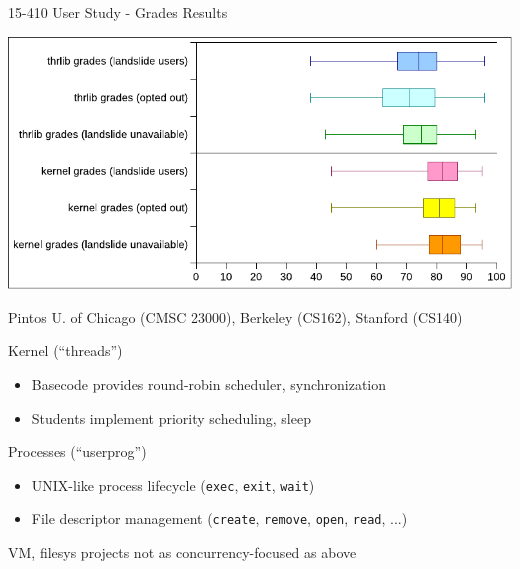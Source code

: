 \documentclass[xcolor=dvipsnames]{beamer}
\begin{document}
\begin{frame}{15-410 User Study - Grades Results} %
	\begin{center}
		\includegraphics[width=\textwidth]{../p2-p3-distribution.pdf}
	\end{center}
\end{frame}


\begin{frame}{Pintos}
	U. of Chicago (CMSC 23000), Berkeley (CS162), Stanford (CS140)
	\linegap

	Kernel (``threads'')
	\begin{itemize}
		\item Basecode provides round-robin scheduler, synchronization
		\item Students implement priority scheduling, sleep
	\end{itemize}
	\linegap

	Processes (``userprog'')
	\begin{itemize}
		\item UNIX-like process lifecycle ({\tt exec}, {\tt exit}, {\tt wait})
		\item File descriptor management ({\tt create}, {\tt remove}, {\tt open}, {\tt read}, ...)
	\end{itemize}
	\linegap

	VM, filesys projects not as concurrency-focused as above
\end{frame}
\end{document}
